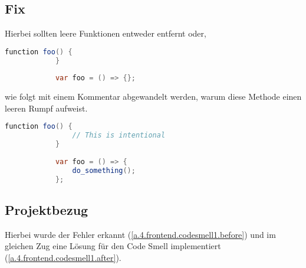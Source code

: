 		\subsection{Fix}
		Hierbei sollten leere Funktionen entweder entfernt oder,
		\begin{lstlisting}[language=java,caption={Non Complient Version - Codesmell 3},gobble=11]
			function foo() {
			}
			
			var foo = () => {};
		\end{lstlisting}
		
		wie folgt mit einem Kommentar abgewandelt werden, warum diese Methode einen leeren Rumpf aufweist.
		
		\begin{lstlisting}[language=java,caption={Complient Version - Codesmell 3},gobble=11]
			function foo() {
				// This is intentional
			}
			
			var foo = () => {
				do_something();
			};
		\end{lstlisting}
		
		\subsection{Projektbezug}
		Hierbei wurde der Fehler erkannt (\cref{a.4.frontend.codesmell1.before}) und im gleichen Zug eine Lösung für den Code Smell implementiert (\cref{a.4.frontend.codesmell1.after}).
